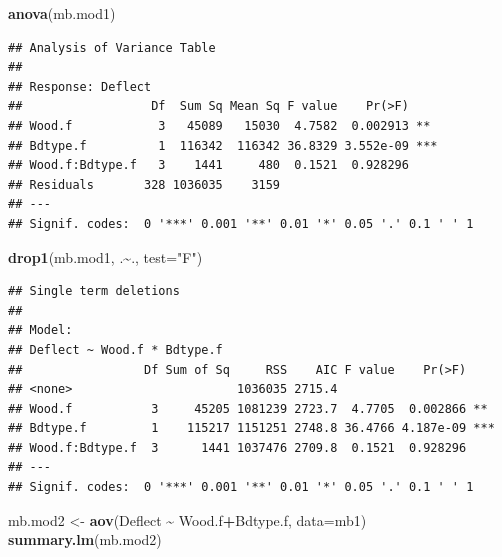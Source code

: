 \documentclass[
]{book}
\newenvironment{Shaded}{\begin{snugshade}}{\end{snugshade}}
\newcommand{\AttributeTok}[1]{\textcolor[rgb]{0.13,0.29,0.53}{#1}}
\newcommand{\FunctionTok}[1]{\textcolor[rgb]{0.13,0.29,0.53}{\textbf{#1}}}
\newcommand{\NormalTok}[1]{#1}
\newcommand{\OtherTok}[1]{\textcolor[rgb]{0.56,0.35,0.01}{#1}}
\newcommand{\SpecialCharTok}[1]{\textcolor[rgb]{0.81,0.36,0.00}{\textbf{#1}}}
\newcommand{\StringTok}[1]{\textcolor[rgb]{0.31,0.60,0.02}{#1}}
\begin{document}
\begin{Shaded}
\begin{Highlighting}[]
\FunctionTok{anova}\NormalTok{(mb.mod1)}
\end{Highlighting}
\end{Shaded}

\begin{verbatim}
## Analysis of Variance Table
## 
## Response: Deflect
##                  Df  Sum Sq Mean Sq F value    Pr(>F)    
## Wood.f            3   45089   15030  4.7582  0.002913 ** 
## Bdtype.f          1  116342  116342 36.8329 3.552e-09 ***
## Wood.f:Bdtype.f   3    1441     480  0.1521  0.928296    
## Residuals       328 1036035    3159                      
## ---
## Signif. codes:  0 '***' 0.001 '**' 0.01 '*' 0.05 '.' 0.1 ' ' 1
\end{verbatim}

\begin{Shaded}
\begin{Highlighting}[]
\FunctionTok{drop1}\NormalTok{(mb.mod1, .}\SpecialCharTok{\textasciitilde{}}\NormalTok{., }\AttributeTok{test=}\StringTok{"F"}\NormalTok{)}
\end{Highlighting}
\end{Shaded}

\begin{verbatim}
## Single term deletions
## 
## Model:
## Deflect ~ Wood.f * Bdtype.f
##                 Df Sum of Sq     RSS    AIC F value    Pr(>F)    
## <none>                       1036035 2715.4                      
## Wood.f           3     45205 1081239 2723.7  4.7705  0.002866 ** 
## Bdtype.f         1    115217 1151251 2748.8 36.4766 4.187e-09 ***
## Wood.f:Bdtype.f  3      1441 1037476 2709.8  0.1521  0.928296    
## ---
## Signif. codes:  0 '***' 0.001 '**' 0.01 '*' 0.05 '.' 0.1 ' ' 1
\end{verbatim}

\begin{Shaded}
\begin{Highlighting}[]
\NormalTok{mb.mod2 }\OtherTok{\textless{}{-}} \FunctionTok{aov}\NormalTok{(Deflect }\SpecialCharTok{\textasciitilde{}}\NormalTok{ Wood.f}\SpecialCharTok{+}\NormalTok{Bdtype.f, }\AttributeTok{data=}\NormalTok{mb1)}
\FunctionTok{summary.lm}\NormalTok{(mb.mod2)}
\end{Highlighting}
\end{Shaded}
\end{document}
